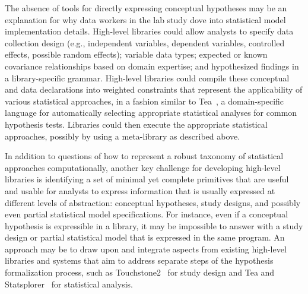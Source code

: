 The absence of tools for directly expressing conceptual hypotheses may be an
explanation for why data workers in the lab study dove into statistical model
implementation details. High-level libraries could allow analysts to specify data
collection design (e.g., independent variables, dependent variables, controlled
effects, possible random effects); variable data types; expected or known
covariance relationships based on domain expertise; and hypothesized findings in
a library-specific grammar. High-level libraries could compile these conceptual
and data declarations into weighted constraints that represent the applicability
of various statistical approaches, in a fashion similar to
Tea~\cite{jun2019tea}, a domain-specific language for automatically selecting
appropriate statistical analyses for common hypothesis tests. Libraries could
then execute the appropriate statistical approaches, possibly by using a
meta-library as described above. 

In addition to questions of how to represent a robust taxonomy of statistical
approaches computationally, another key challenge for developing high-level
libraries is identifying a set of minimal yet complete primitives that are
useful and usable for analysts to express information that is usually expressed
at different levels of abstraction: conceptual hypotheses, study designs, and
possibly even partial statistical model specifications. For instance, even if a
conceptual hypothesis is expressible in a library, it may be impossible to
answer with a study design or partial statistical model that is expressed in the
same program. An approach may be to draw upon and integrate aspects from
existing high-level libraries and systems that aim to address separate steps of
the hypothesis formalization process, such as
Touchstone2~\cite{eiselmayer2019touchstone2} for study design and Tea and
Statsplorer~\cite{wacharamanotham2015statsplorer} for statistical analysis. 



